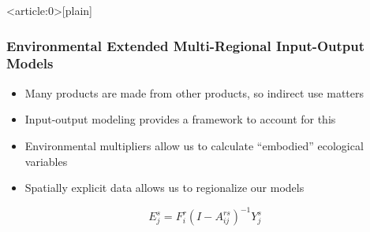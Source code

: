 \documentclass[aspectratio=169]{beamer}
\begin{document}
{
\begin{frame}<article:0>[plain]
   \frametitle{}
\end{frame}
}


\begin{frame}
  \frametitle{Environmental Extended Multi-Regional Input-Output Models}
  \begin{itemize}
  \item Many products are made from other products, so indirect use
  matters \pause
  \item Input-output modeling provides a framework to account for this \pause
  \item Environmental multipliers allow us to calculate ``embodied''
  ecological variables \pause
  \item Spatially explicit data allows us to regionalize our models \pause
    \end{itemize}
    \begin{center}
    \begin{equation}
        E_{j}^{s} = F_{i}^{r}(I - A_{ij}^{rs})^{-1}Y_{j}^{s}
    \end{equation}
    \end{center}
\end{frame}
\end{document}
